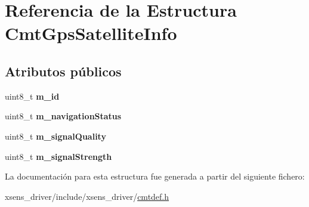 \hypertarget{structCmtGpsSatelliteInfo}{\section{\-Referencia de la \-Estructura \-Cmt\-Gps\-Satellite\-Info}
\label{structCmtGpsSatelliteInfo}
}
\subsection*{\-Atributos públicos}
\begin{DoxyCompactItemize}
\item 
\hypertarget{structCmtGpsSatelliteInfo_a4eabee991a56921bac47420cb9309199}{uint8\-\_\-t {\bfseries m\-\_\-id}}\label{structCmtGpsSatelliteInfo_a4eabee991a56921bac47420cb9309199}

\item 
\hypertarget{structCmtGpsSatelliteInfo_a701634593c186df1d429324e80268adf}{uint8\-\_\-t {\bfseries m\-\_\-navigation\-Status}}\label{structCmtGpsSatelliteInfo_a701634593c186df1d429324e80268adf}

\item 
\hypertarget{structCmtGpsSatelliteInfo_a0d09dfb80f79451758a2749766158110}{uint8\-\_\-t {\bfseries m\-\_\-signal\-Quality}}\label{structCmtGpsSatelliteInfo_a0d09dfb80f79451758a2749766158110}

\item 
\hypertarget{structCmtGpsSatelliteInfo_a6229b5f4b8b43155d57ceba3484a09a5}{uint8\-\_\-t {\bfseries m\-\_\-signal\-Strength}}\label{structCmtGpsSatelliteInfo_a6229b5f4b8b43155d57ceba3484a09a5}

\end{DoxyCompactItemize}


\-La documentación para esta estructura fue generada a partir del siguiente fichero\-:\begin{DoxyCompactItemize}
\item 
xsens\-\_\-driver/include/xsens\-\_\-driver/\hyperlink{cmtdef_8h}{cmtdef.\-h}\end{DoxyCompactItemize}
